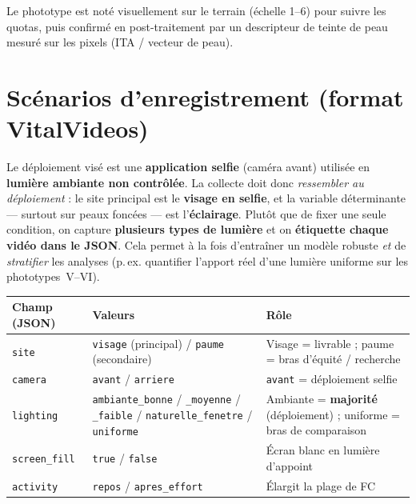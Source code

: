 \documentclass[11pt,a4paper]{article}
\begin{document}
\noindent Le phototype est noté visuellement sur le terrain (échelle 1--6) pour
suivre les quotas, puis confirmé en post-traitement par un descripteur de teinte
de peau mesuré sur les pixels (ITA / vecteur de peau).

\section{Scénarios d'enregistrement (format VitalVideos)}
\label{sec:scenarios}

Le déploiement visé est une \textbf{application selfie} (caméra avant) utilisée en
\textbf{lumière ambiante non contrôlée}. La collecte doit donc \emph{ressembler au
déploiement} : le site principal est le \textbf{visage en selfie}, et la variable
déterminante --- surtout sur peaux foncées --- est l'\textbf{éclairage}. Plutôt que
de fixer une seule condition, on capture \textbf{plusieurs types de lumière} et on
\textbf{étiquette chaque vidéo dans le JSON}. Cela permet à la fois d'entraîner un
modèle robuste \emph{et} de \emph{stratifier} les analyses (p.\,ex. quantifier
l'apport réel d'une lumière uniforme sur les phototypes~V--VI).

\begin{center}
\begin{tabularx}{\textwidth}{P{2.6cm} P{5.6cm} X}
\toprule
\textbf{Champ (JSON)} & \textbf{Valeurs} & \textbf{Rôle} \\
\midrule
\texttt{site} & \texttt{visage} (principal) / \texttt{paume} (secondaire) & Visage = livrable ; paume = bras d'équité / recherche \\
\texttt{camera} & \texttt{avant} / \texttt{arriere} & \texttt{avant} = déploiement selfie \\
\texttt{lighting} & \texttt{ambiante\_bonne} / \texttt{\_moyenne} / \texttt{\_faible} / \texttt{naturelle\_fenetre} / \texttt{uniforme} & Ambiante = \textbf{majorité} (déploiement) ; uniforme = bras de comparaison \\
\texttt{screen\_fill} & \texttt{true} / \texttt{false} & Écran blanc en lumière d'appoint \\
\texttt{activity} & \texttt{repos} / \texttt{apres\_effort} & Élargit la plage de FC \\
\bottomrule
\end{tabularx}
\end{center}
\end{document}
